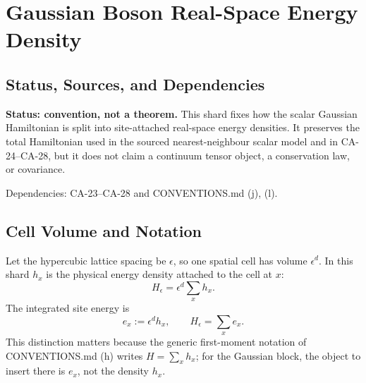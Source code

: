 
\section{Gaussian Boson Real-Space Energy Density}
\label{sec:gaussian-boson-real-space-density}

\subsection{Status, Sources, and Dependencies}

\textbf{Status: convention, not a theorem.}  This shard fixes how the scalar
Gaussian Hamiltonian is split into site-attached real-space energy densities.
It preserves the total Hamiltonian used in the sourced nearest-neighbour
scalar model and in CA-24--CA-28, but it does not claim a continuum tensor
object, a conservation law, or covariance.

Dependencies: CA-23--CA-28 and CONVENTIONS.md (j), (l).


\subsection{Cell Volume and Notation}

Let the hypercubic lattice spacing be \(\epsilon\), so one spatial cell has
volume \(\epsilon^d\).  In this shard \(h_x\) is the physical energy density
attached to the cell at \(x\):
\[
  H_\epsilon=\epsilon^d\sum_x h_x.
\]
The integrated site energy is
\[
  e_x:=\epsilon^d h_x,
  \qquad
  H_\epsilon=\sum_x e_x .
\]
This distinction matters because the generic first-moment notation of
CONVENTIONS.md (h) writes \(H=\sum_x h_x\); for the Gaussian block, the object
to insert there is \(e_x\), not the density \(h_x\).

